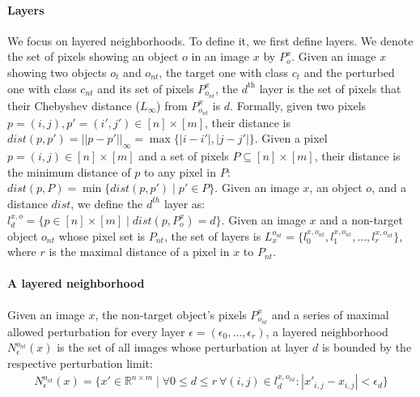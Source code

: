 \paragraph{Layers}
We focus on layered neighborhoods.
To define it, we first define layers. We denote the set of pixels showing an object $o$ in an image $x$ by $P_o^x$.
Given an image $x$ showing two objects $o_t$ and $o_{nt}$, the target one with class $c_t$ and the perturbed one with class $c_{nt}$ and its set of pixels ${P_{o_{nt}}^x}$, the $d^\text{th}$ layer is the set of pixels that their Chebyshev distance ($L_\infty$) from ${P_{o_{nt}}^x}$ is $d$.
Formally, given two pixels $p = (i,j), p' = (i', j') \in [n]\times [m]$, their distance is $dist(p, p') = ||p - p'||_\infty = \max\{|i - i'|, |j - j'|\}$.
Given a pixel $p = (i, j)\in [n]\times [m]$ and a set of pixels $P \subseteq [n]\times [m]$, their distance is the minimum distance of $p$ to any pixel in $P$: $dist(p, P) = \min\{dist(p, p') \mid p' \in P\}$.
Given an image $x$, an object $o$, and a distance $dist$, we define the $d^{th}$ layer as:
$l_d^{x,o} = \{p \in [n]\times [m] \mid dist(p, P_o^x) = d\}$.
Given an image $x$ and a non-target object $o_{nt}$ whose pixel set is $P_{nt}$, the set of layers is $L_x^{o_{nt}} = \{l_0^{x, o_{nt}}, l_1^{x, o_{nt}}, \ldots, l_r^{x, o_{nt}}\}$, where $r$ is the maximal distance of a pixel in $x$ to $P_{nt}$. %

\paragraph{A layered neighborhood}\label{par:layeredneighborhood} Given an image $x$, the non-target object's pixels ${P_{o_{nt}}^x}$ and a series of maximal allowed perturbation for every layer $\epsilon=(\epsilon_0,\ldots,\epsilon_r)$, a layered neighborhood ${N^{o_{nt}}_\epsilon}(x)$ is the set of all images whose perturbation at layer $d$ is bounded by the respective perturbation limit:
\begin{gather*}
    {N^{o_{nt}}_\epsilon}(x) = \{x' \in \mathbb{R}^{n \times m} \mid \forall 0\leq d\leq r\ \forall (i,j)\in l_d^{x,o_{nt}}: |x'_{i,j} - x_{i,j}|<\epsilon_d\}
\end{gather*}

